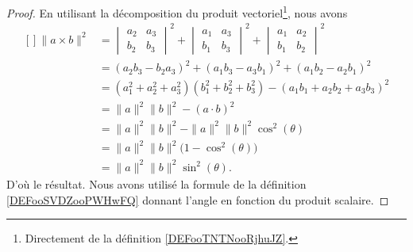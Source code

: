 \begin{proof}
	En utilisant la décomposition du produit vectoriel\footnote{Directement de la définition \ref{DEFooTNTNooRjhuJZ}.}, nous avons
	\begin{equation}
		\begin{aligned}[]
			\| a\times b \|^2 & =\begin{vmatrix}
				a_2 & a_3 \\
				b_2 & b_3
			\end{vmatrix}^2+\begin{vmatrix}
				a_1 & a_3 \\
				b_1 & b_3
			\end{vmatrix}^2+\begin{vmatrix}
				a_1 & a_2 \\
				b_1 & b_2
			\end{vmatrix}^2 \\
			                  & =(a_2b_3-b_2a_3)^2+(a_1b_3-a_3b_1)^2+(a_1b_2-a_2b_1)^2                                  \\
			                  & =(a_1^2+a_2^2+a_3^2)(b_1^2+b_2^2+b_3^2)-(a_1b_1+a_2b_2+a_3b_3)^2                        \\
			                  & =\| a \|^2\| b \|^2-(a\cdot b)^2                                                        \\
			                  & =\| a \|^2\| b \|^2-\| a \|^2\| b \|^2\cos^2(\theta)                                    \\
			                  & =\| a \|^2\| b \|^2\big( 1-\cos^2(\theta) \big)                                         \\
			                  & =\| a \|^2\| b \|^2\sin^2(\theta).
		\end{aligned}
	\end{equation}
	D'où le résultat. Nous avons utilisé la formule de la définition \eqref{DEFooSVDZooPWHwFQ} donnant l'angle en fonction du produit scalaire.
\end{proof}

